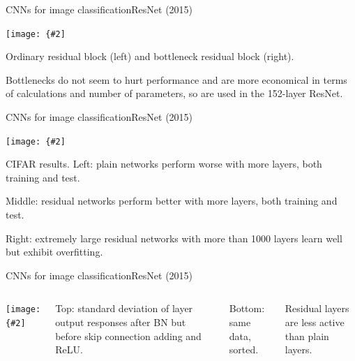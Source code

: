 \documentclass[aspectratio=169]{beamer}
\newcommand{\myfig}[3]{\centerline{\texttt{[image: \{\#2]}}}
\begin{document}
\begin{frame}{CNNs for image classification}{ResNet (2015)}

  \myfig{4in}{he-fig5}{He et al.\ (2016), Fig.\ 5}

  \medskip

  Ordinary residual block (left) and bottleneck residual block (right).

  \medskip

  Bottlenecks do not seem to hurt performance and are more economical
  in terms of calculations and number of parameters, so are used in
  the 152-layer ResNet.

\end{frame}


\begin{frame}{CNNs for image classification}{ResNet (2015)}

  \myfig{4.2in}{he-fig6}{He et al.\ (2016), Fig.\ 6}

  \medskip

  CIFAR results.
  Left: plain networks perform worse with more layers, both training
  and test.

  \medskip

  Middle: residual networks perform better with more layers, both
  training and test.

  \medskip

  Right: extremely large residual networks with more than 1000 layers
  learn well but exhibit overfitting.
  
\end{frame}


\begin{frame}{CNNs for image classification}{ResNet (2015)}

  \begin{columns}

    \column{2.5in}
    
    \myfig{2.4in}{he-fig7}{He et al.\ (2016), Fig.\ 7}

    \column{2in}

    Top: standard deviation of layer output responses after BN but
    before skip connection adding and ReLU.

    \medskip

    Bottom: same data, sorted.

    \medskip

    Residual layers are less active than plain layers.

  \end{columns}
  
\end{frame}
\end{document}
